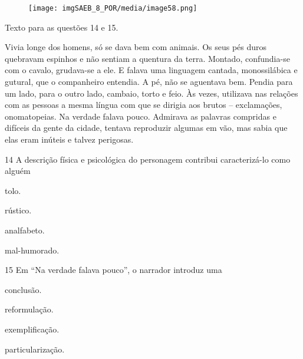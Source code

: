 \begin{figure}[H]
\texttt{[image: imgSAEB\_8\_POR/media/image58.png]}
\end{figure}

Texto para as questões 14 e 15.

\begin{myquote}
Vivia longe dos homens, só se dava bem com animais. Os seus pés duros
quebravam espinhos e não sentiam a quentura da terra. Montado,
confundia-se com o cavalo, grudava-se a ele. E falava uma linguagem
cantada, monossilábica e gutural, que o companheiro entendia. A pé, não
se aguentava bem. Pendia para um lado, para o outro lado, cambaio, torto
e feio. Às vezes, utilizava nas relações com as pessoas a mesma língua
com que se dirigia aos brutos -- exclamações, onomatopeias. Na verdade
falava pouco. Admirava as palavras compridas e difíceis da gente da
cidade, tentava reproduzir algumas em vão, mas sabia que elas eram
inúteis e talvez perigosas.

\end{myquote}

\num{14} A descrição física e psicológica do personagem contribui caracterizá-lo
como alguém

\begin{escolha}
\item tolo.

\item rústico.

\item analfabeto.

\item mal-humorado.
\end{escolha}

\num{15} Em ``Na verdade falava pouco'', o narrador introduz uma

\begin{escolha}
\item conclusão.

\item reformulação.

\item exemplificação.

\item particularização.
\end{escolha}
